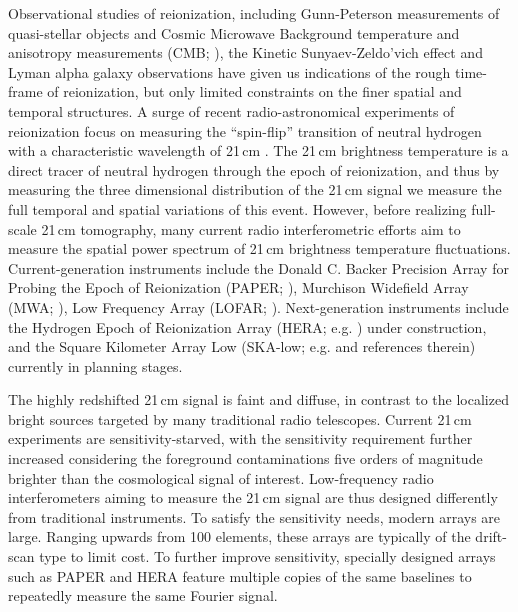 \documentclass[twocolumn,apj,numberedappendix]{emulateapj}
\renewcommand\[{\begin{equation}}
\renewcommand\]{\end{equation}}
\begin{document}
Observational studies of reionization, including Gunn-Peterson measurements of quasi-stellar objects \citep{Fan2006} and Cosmic Microwave Background temperature and anisotropy measurements (CMB; \citealt{Planck2016}), the Kinetic Sunyaev-Zeldo'vich effect \citep{ZahnKSZ, GeorgeKSZ, kszpatchy} and Lyman alpha galaxy observations \citep{Rhoads2017, Rhoads2012, mcquinnLyA} have given us indications of the rough time-frame of reionization, but only limited constraints on the finer spatial and temporal structures. A surge of recent radio-astronomical experiments of reionization focus on measuring the ``spin-flip'' transition of neutral
hydrogen with a characteristic wavelength of 21\,cm \citep{Furlanetto2006181,PritchardLoeb}.
The 21\,cm brightness temperature is a direct tracer of neutral hydrogen through the epoch of reionization, and thus by measuring the three dimensional distribution of the 21\,cm signal we measure the full temporal and spatial variations of this event. 
However, before realizing full-scale 21\,cm tomography, many current radio interferometric efforts
aim to measure the spatial power spectrum of 21\,cm brightness temperature fluctuations.
Current-generation instruments include the Donald C. Backer Precision Array for Probing
the Epoch of Reionization (PAPER; \citealt{Ali2015,paper32}), Murchison
Widefield Array (MWA; \citealt{Bowman2013, Tingay2013}), Low Frequency Array (LOFAR; \citealt{LOFAR}). Next-generation instruments include the Hydrogen Epoch of Reionization
Array (HERA; e.g. \citealt{HERA,HERAconfiguration,HERABEAM1,HERADISH2}) under construction, 
and the Square Kilometer Array Low (SKA-low; e.g. \citealt{skalow2015} and references therein) currently in planning stages. 

The highly redshifted 21\,cm signal is faint and diffuse, in contrast to the localized bright sources targeted by many traditional radio telescopes.  Current 21\,cm experiments are sensitivity-starved, with the sensitivity requirement further increased considering the foreground contaminations five orders of magnitude brighter than the cosmological signal of interest. Low-frequency radio interferometers aiming to measure the 21\,cm signal are thus designed differently from traditional instruments. To satisfy the sensitivity needs, modern arrays are large. Ranging upwards from 100 elements, these arrays are typically of the drift-scan type to limit cost. To further improve sensitivity, specially designed arrays such as PAPER and HERA feature multiple copies of the same baselines to repeatedly measure the same Fourier signal\citep{first-paper}. 
\end{document}
